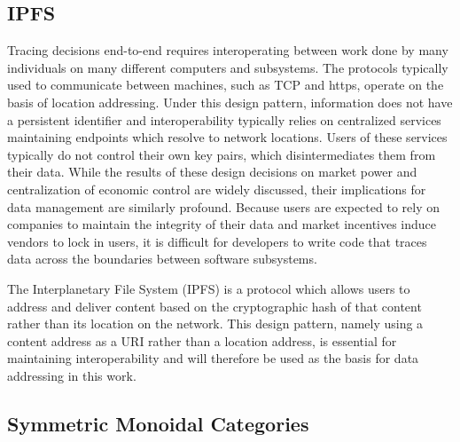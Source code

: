 \documentclass[9pt, oneside]{article}   	%
\begin{document}
\begin{multicols}{2}
\subsection{IPFS}\label{IPFS}
Tracing decisions end-to-end requires interoperating between work done by many individuals on many different computers and subsystems. The protocols typically used to communicate between machines, such as TCP and https, operate on the basis of location addressing. Under this design pattern, information does not have a persistent identifier and interoperability typically relies on centralized services maintaining endpoints which resolve to network locations. Users of these services typically do not control their own key pairs, which disintermediates them from their data. While the results of these design decisions on market power and centralization of economic control are widely discussed, their implications for data management are similarly profound. Because users are expected to rely on companies to maintain the integrity of their data and market incentives induce vendors to lock in users, it is difficult for developers to write code that traces data across the boundaries between software subsystems.

The Interplanetary File System (IPFS) is a protocol which allows users to address and deliver content based on the cryptographic hash of that content rather than its location on the network. This design pattern, namely using a content address as a URI rather than a location address, is essential for maintaining interoperability and will therefore be used as the basis for data addressing in this work.

\subsection{Symmetric Monoidal Categories}\label{smc}




\end{multicols}
\end{document}
